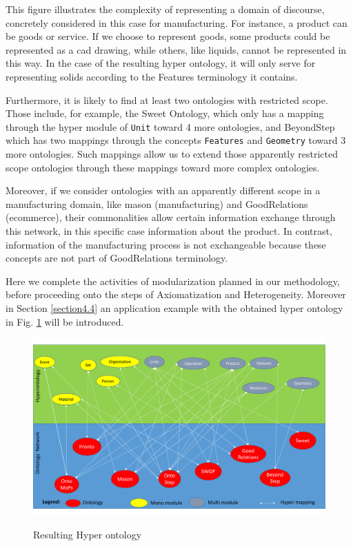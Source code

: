 This figure illustrates the complexity of representing a domain of discourse, concretely considered in this case for manufacturing. For instance, a product can be goods or  service. If we choose to represent goods, some products could be represented as a \gls{cad} drawing, while others, like liquids, cannot be represented in this way. In the case of the resulting hyper ontology, it will only serve for representing solids according to the Features terminology it contains.

Furthermore, it is likely to find at least two   ontologies with restricted scope. Those include, for example, the Sweet Ontology, which only has a mapping through the hyper module of \texttt{Unit} toward 4 more ontologies, and BeyondStep which has two mappings through the concepts \texttt{Features} and \texttt{Geometry} toward 3 more ontologies. Such mappings allow us to extend those apparently restricted scope  ontologies through these mappings toward more complex ontologies.

Moreover, if we consider ontologies with an apparently  different scope in a manufacturing domain, like \gls{mason} (manufacturing) and GoodRelations (ecommerce), their commonalities allow certain information exchange through this network, in this specific case information about the product. In contrast, information of the manufacturing process is not exchangeable because these concepts are not part of GoodRelations terminology. 

Here we complete the activities of modularization planned in our methodology, before proceeding onto the steps of Axiomatization and Heterogeneity. Moreover in Section \ref{section4.4} an application example with the obtained hyper ontology in Fig. \ref{figure4-28} will be introduced. 



\begin{figure}

\begin{center}
	\includegraphics[scale=0.6, angle=90]{figure-chapterIV/fig4-28.pdf}\\
	\caption{Resulting Hyper ontology}
	\label{figure4-28}
\end{center}
\end{figure}



